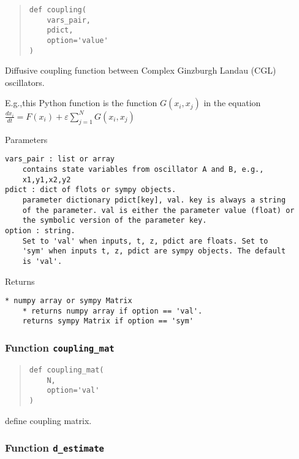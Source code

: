\documentclass[english,a4paper,oneside]{article}
\begin{document}
\begin{quote}
\begin{verbatim}
def coupling(
    vars_pair,
    pdict,
    option='value'
)
\end{verbatim}
\end{quote}

Diffusive coupling function between Complex Ginzburgh Landau (CGL)
oscillators.

E.g.,this Python function is the function \(G(x_i,x_j)\) in the equation
\(\frac{dx_i}{dt} = F(x_i) + \varepsilon \sum_{j=1}^N G(x_i,x_j)\)

Parameters

\begin{verbatim}
vars_pair : list or array
    contains state variables from oscillator A and B, e.g.,
    x1,y1,x2,y2
pdict : dict of flots or sympy objects.
    parameter dictionary pdict[key], val. key is always a string
    of the parameter. val is either the parameter value (float) or 
    the symbolic version of the parameter key.
option : string.
    Set to 'val' when inputs, t, z, pdict are floats. Set to
    'sym' when inputs t, z, pdict are sympy objects. The default
    is 'val'.
\end{verbatim}

Returns

\begin{verbatim}
* numpy array or sympy Matrix
    * returns numpy array if option == 'val'. 
    returns sympy Matrix if option == 'sym'
\end{verbatim}

\hypertarget{CGL.coupling_mat}{%
\subsubsection{\texorpdfstring{Function
\texttt{coupling\_mat}}{Function coupling\_mat}}\label{CGL.coupling_mat}}

\begin{quote}
\begin{verbatim}
def coupling_mat(
    N,
    option='val'
)
\end{verbatim}
\end{quote}

define coupling matrix.

\hypertarget{CGL.d_estimate}{%
\subsubsection{\texorpdfstring{Function
\texttt{d\_estimate}}{Function d\_estimate}}\label{CGL.d_estimate}}
\end{document}
